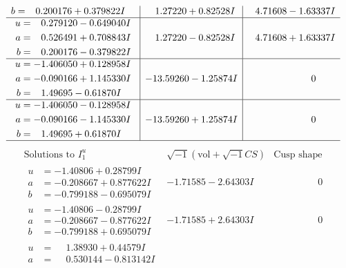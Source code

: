 \documentclass[1p]{elsarticle_modified}
\theoremstyle{definition}
\newcommand{\I}{\sqrt{-1}}
\begin{document}
$$\begin{array}{c|c|c}
\begin{aligned}
b &= \phantom{-}0.200176 + 0.379822 I\end{aligned}
 & \phantom{-}1.27220 + 0.82528 I & \phantom{-}4.71608 - 1.63337 I \\ \hline\begin{aligned}
u &= \phantom{-}0.279120 - 0.649040 I \\
a &= \phantom{-}0.526491 + 0.708843 I \\
b &= \phantom{-}0.200176 - 0.379822 I\end{aligned}
 & \phantom{-}1.27220 - 0.82528 I & \phantom{-}4.71608 + 1.63337 I \\ \hline\begin{aligned}
u &= -1.406050 + 0.128958 I \\
a &= -0.090166 + 1.145330 I \\
b &= \phantom{-}1.49695 - 0.61870 I\end{aligned}
 & -13.59260 - 1.25874 I & \phantom{-0.000000 } 0 \\ \hline\begin{aligned}
u &= -1.406050 - 0.128958 I \\
a &= -0.090166 - 1.145330 I \\
b &= \phantom{-}1.49695 + 0.61870 I\end{aligned}
 & -13.59260 + 1.25874 I & \phantom{-0.000000 } 0\\
 \hline 
 \end{array}$$\newpage$$\begin{array}{c|c|c}  
\text{Solutions to }I^u_{1}& \I (\text{vol} + \sqrt{-1}CS) & \text{Cusp shape}\\
 \hline 
\begin{aligned}
u &= -1.40806 + 0.28799 I \\
a &= -0.208667 + 0.877622 I \\
b &= -0.799188 - 0.695079 I\end{aligned}
 & -1.71585 - 2.64303 I & \phantom{-0.000000 } 0 \\ \hline\begin{aligned}
u &= -1.40806 - 0.28799 I \\
a &= -0.208667 - 0.877622 I \\
b &= -0.799188 + 0.695079 I\end{aligned}
 & -1.71585 + 2.64303 I & \phantom{-0.000000 } 0 \\ \hline\begin{aligned}
u &= \phantom{-}1.38930 + 0.44579 I \\
a &= \phantom{-}0.530144 - 0.813142 I \\

\end{aligned}
\end{array}$$
\end{document}
